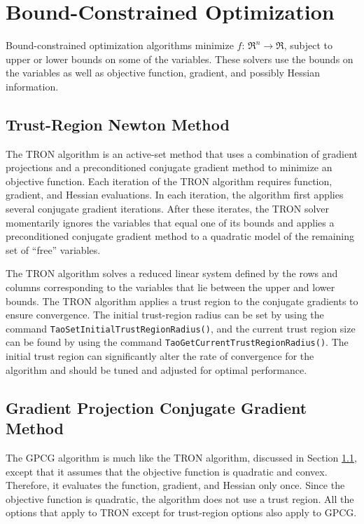 \section{Bound-Constrained Optimization}
\label{chapter:bound}

Bound-constrained optimization algorithms
minimize $f: \, \Re^n \to \Re$, subject to upper or
lower bounds on some of the variables.
These solvers use the bounds on the variables as well as objective
function, gradient, and possibly Hessian information.

\subsection{Trust-Region Newton Method}\label{sec:tron}  
The TRON \cite{lin_c3} algorithm is an active-set method that uses a 
combination of gradient projections and 
a preconditioned conjugate gradient method to minimize an objective function.
Each iteration of the TRON algorithm requires function, gradient, 
and Hessian evaluations.  In each iteration, the algorithm
first applies several conjugate gradient iterations.  
After these iterates, the TRON solver momentarily ignores the variables
that equal one of its bounds and
applies a preconditioned conjugate gradient method to a
quadratic model of the remaining set of ``free'' variables.  


The TRON algorithm solves a reduced linear system
defined by the rows and columns corresponding to the variables that
lie between the upper and lower bounds.
The TRON algorithm applies a trust region to the 
conjugate gradients to ensure convergence.  The initial trust-region
radius
can be set by using the command 
{\tt Tao\-Set\-Initial\-Trust\-Region\-Radius()},
and the current trust region size can be found by using the command
{\tt Tao\-Get\-Current\-Trust\-Region\-Radius()}.
The initial trust region can significantly alter the 
rate of convergence for the algorithm and should be
tuned and adjusted for optimal performance.


\subsection{Gradient Projection Conjugate Gradient Method}
The GPCG \cite{more-toraldo} algorithm is much like the TRON algorithm, discussed in
Section \ref{sec:tron}, except that
it assumes that the objective function is quadratic and convex.
Therefore, it evaluates the function, gradient, and Hessian only
once.
Since the objective function
is quadratic, the algorithm does not use a trust region.  
All the options that apply to TRON except for trust-region
options also apply to GPCG.

